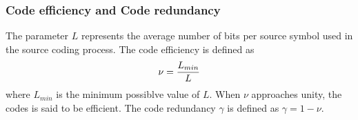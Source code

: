 \documentclass[a4]{beamer}
\begin{document}
\begin{frame}
\frametitle{Code efficiency and Code redundancy}
The parameter $L$ represents the average number of bits per source symbol used in the source coding process.
The code efficiency is defined as \[\nu = {L_{min} \over L} \]where $L_{min}$ is the minimum possiblve value of $L$. When $\nu$ approaches unity, the codes is said to be efficient.
The code redundancy $\gamma$ is defined as $\gamma = 1- \nu$.
\end{frame}
\end{document}
